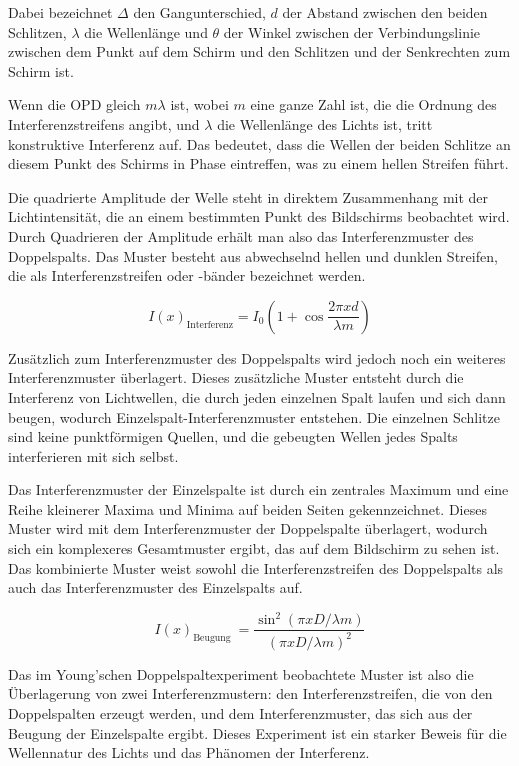 \documentclass[12pt,english,ngerman]{scrartcl}
\begin{document}

Dabei bezeichnet $\Delta$ den Gangunterschied, $d$ der Abstand zwischen den beiden Schlitzen, $\lambda$ die Wellenlänge
und $\theta$ der Winkel zwischen der
Verbindungslinie zwischen dem Punkt auf dem Schirm und den Schlitzen und der
Senkrechten zum Schirm ist.

Wenn die OPD gleich $m \lambda$ ist, wobei $m$ eine ganze Zahl ist, die die Ordnung des
Interferenzstreifens angibt, und $\lambda$ die Wellenlänge des Lichts ist, tritt
konstruktive Interferenz auf. Das bedeutet, dass die Wellen der beiden Schlitze
an diesem Punkt des Schirms in Phase eintreffen, was zu einem hellen Streifen
führt.

Die quadrierte Amplitude der Welle steht in direktem Zusammenhang mit der
Lichtintensität, die an einem bestimmten Punkt des Bildschirms beobachtet wird.
Durch Quadrieren der Amplitude erhält man also das Interferenzmuster des
Doppelspalts. Das Muster besteht aus abwechselnd hellen und dunklen Streifen,
die als Interferenzstreifen oder -bänder bezeichnet werden.

\begin{equation}
	I(x)_{\text {Interferenz}}=I_0\left(1+\cos \frac{2 \pi x d}{\lambda m}\right)
\end{equation}


Zusätzlich zum Interferenzmuster des Doppelspalts wird jedoch noch ein weiteres
Interferenzmuster überlagert. Dieses zusätzliche Muster entsteht durch die
Interferenz von Lichtwellen, die durch jeden einzelnen Spalt laufen und sich
dann beugen, wodurch Einzelspalt-Interferenzmuster entstehen. Die einzelnen
Schlitze sind keine punktförmigen Quellen, und die gebeugten Wellen jedes
Spalts interferieren mit sich selbst.

Das Interferenzmuster der Einzelspalte ist durch ein zentrales Maximum und eine
Reihe kleinerer Maxima und Minima auf beiden Seiten gekennzeichnet. Dieses
Muster wird mit dem Interferenzmuster der Doppelspalte überlagert, wodurch sich
ein komplexeres Gesamtmuster ergibt, das auf dem Bildschirm zu sehen ist. Das
kombinierte Muster weist sowohl die Interferenzstreifen des Doppelspalts als
auch das Interferenzmuster des Einzelspalts auf.

\begin{equation}
	I(x)_{\text {Beugung }}=\frac{\sin ^2(\pi x D / \lambda m)}{(\pi x D / \lambda m)^2}
\end{equation}

Das im Young'schen Doppelspaltexperiment beobachtete Muster ist also die
Überlagerung von zwei Interferenzmustern: den Interferenzstreifen, die von den
Doppelspalten erzeugt werden, und dem Interferenzmuster, das sich aus der
Beugung der Einzelspalte ergibt. Dieses Experiment ist ein starker Beweis für
die Wellennatur des Lichts und das Phänomen der Interferenz.
\end{document}
